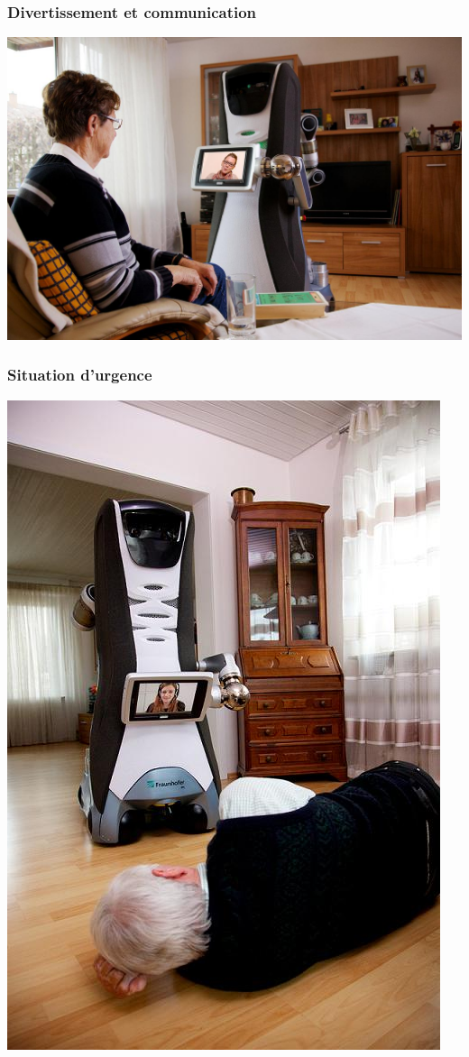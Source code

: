 \begin{frame}
	\frametitle{Divertissement et communication}
	\includegraphics[scale = 0.36]{./image/Communication.JPG}
\end{frame}

\begin{frame}
	\frametitle{Situation d'urgence}
	\includegraphics[scale = 0.36]{./image/EmergencySupport.JPG}
\end{frame}

